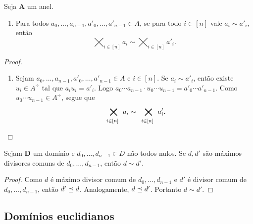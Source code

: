 \begin{proposition}
Seja $\bm A$ um anel.
	\begin{enumerate}
	\item Para todos $a_0,\ldots,a_{n-1},a'_0,\ldots,a'_{n-1} \in A$, se para todo $i \in [n]$ vale $a_i \sim a'_i$, então
		\begin{equation*}
		\bigtimes_{i \in [n]} a_i \sim \bigtimes_{i \in [n]} a'_i.
		\end{equation*}
	\end{enumerate}
\end{proposition}
\begin{proof}
	\begin{enumerate}
	\item Sejam $a_0,\ldots,a_{n-1},a'_0,\ldots,a'_{n-1} \in A$ e $i \in [n]$. Se $a_i \sim a'_i$, então existe $u_i \in A^{\div}$ tal que $a_iu_i = a'_i$. Logo $a_0 \cdots a_{n-1} \cdot u_0 \cdots u_{n-1} = a'_0 \cdots a'_{n-1}$. Como $u_0 \cdots u_{n-1} \in A^{\div}$, segue que
		\begin{equation*}
		\bigtimes_{i \in [n]} a_i \sim \bigtimes_{i \in [n]} a'_i. \qedhere
		\end{equation*}
	\end{enumerate}
\end{proof}

\begin{proposition}
Sejam $\bm D$ um domínio e $d_0, \ldots, d_{n-1} \in D$ não todos nulos. Se $d,d'$ são máximos divisores comuns de $d_0,\ldots,d_{n-1}$, então $d \sim d'$.
\end{proposition}
\begin{proof}
Como $d$ é máximo divisor comum de $d_0,\ldots,d_{n-1}$ e $d'$ é divisor comum de $d_0,\ldots,d_{n-1}$, então $d' \preceq d$. Analogamente, $d \preceq d'$.
Portanto $d \sim d'$.
\end{proof}















\subsection{Domínios euclidianos}

